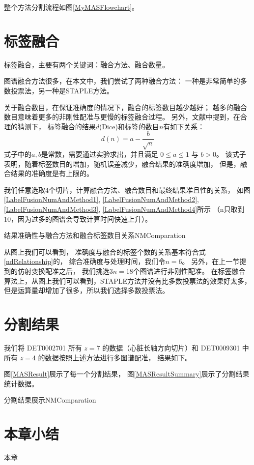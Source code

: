 整个方法分割流程如图\ref{MyMASFlowchart}。

\section{标签融合}

标签融合，主要有两个关键词：融合方法、融合数量。

图谱融合方法很多，在本文中，我们尝试了两种融合方法：
一种是非常简单的多数投票法，另一种是STAPLE方法。

关于融合数目，在保证准确度的情况下，融合的标签数目越少越好；
越多的融合数目意味着更多的非刚性配准与更慢的标签融合过程。
另外，文献\cite{HeckemannMultiClassifier2006}中提到，在合理的猜测下，
标签融合的结果$d$(Dice)和标签的数目$n$有如下关系：
\begin{equation}\label{ndRelationship}
  d(n)=a-\frac{b}{\sqrt{n}}
\end{equation}
式子中的$a,b$是常数，需要通过实验求出，并且满足 $0\le a\le 1$ 与 $b>0$。
该式子表明，随着标签数目的增加，随机误差减少，融合结果的准确度增加，
但是，融合结果的准确度是有上限的。

我们任意选取4个切片，计算融合方法、融合数目和最终结果准且性的关系，
如图\ref{LabelFusionNumAndMethod1}, \ref{LabelFusionNumAndMethod2},
\ref{LabelFusionNumAndMethod3}, \ref{LabelFusionNumAndMethod4}所示
（n只取到10，因为过多的图谱会导致计算时间快速上升）。
\begin{pics}[htpb]{结果准确性与融合方法和融合标签数目关系}{NMComparation}
\end{pics}

从图上我们可以看到，
准确度与融合的标签个数的关系基本符合式\ref{ndRelationship}的，
综合准确度与处理时间，我们令$n=6$。
另外，在上一节提到的仿射变换配准之后，
我们挑选$3n=18$个图谱进行非刚性配准。
在标签融合算法上，从图上我们可以看到，STAPLE方法并没有比多数投票法的效果好太多，
但是运算量却增加了很多，所以我们选择多数投票法。

\section{分割结果}
我们将 DET0002701 所有 $z=7$ 的数据（心脏长轴方向切片）和 
DET0009301 中所有 $z=4$ 的数据按照上述方法进行多图谱配准，
结果如下。

图\ref{MASResult}展示了每一个分割结果，
图\ref{MASResultSummary}展示了分割结果统计数据。
\begin{pics}[htpb]{分割结果展示}{NMComparation}
\end{pics}

\section{本章小结}
本章
